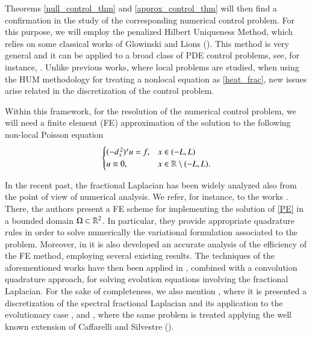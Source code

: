 Theorems \ref{null_control_thm} and \eqref{approx_control_thm} will then find a confirmation in the study of the corresponding numerical control problem. For this purpose, we will employ the penalized Hilbert Uniqueness Method, which relies on some classical works of Glowinski and Lions (\cite{glowinski1995exact,glowinski2008exact}). This method is very general and it can be applied to a broad class of PDE control problems, see, for instance, \cite{boyer2013penalised,boyer2017insensitizing,boyer2014approximate,khodja2017partial}. Unlike previous works, where local problems are studied, when using the HUM methodology for treating a nonlocal equation as \eqref{heat_frac}, new issues arise related in the discretization of the control problem. 

Within this framework, for the resolution of the numerical control problem, we will need a finite element (FE)  approximation of the solution to the following non-local Poisson equation
\begin{align}\label{PE}
	\begin{cases}
		(-d_x^{\,2})^{s}u = f, & x\in(-L,L)
		\\
		u\equiv 0, & x\in\mathbb{R}\setminus(-L,L).
	\end{cases}
\end{align}

In the recent past, the fractional Laplacian has been widely analyzed also from the point of view of numerical analysis. We refer, for instance, to the works \cite{acosta2017short,acosta2017fractional,borthagaray2017laplaciano}. There, the authors present a FE scheme for implementing the solution of \eqref{PE} in a bounded domain $\Omega\subset\mathbb{R}^2$. In particular, they provide appropriate quadrature rules in order to solve numerically the variational formulation associated to the problem. Moreover, in \cite{acosta2017fractional,borthagaray2017laplaciano} it is also developed an accurate analysis of the efficiency of the FE method, employing several existing results. The techniques of the aforementioned works have then been applied in \cite{acosta2017finite}, combined with a convolution quadrature approach, for solving evolution equations involving the fractional Laplacian. For the sake of completeness, we also mention \cite{bonito2015numerical}, where it is presented a discretization of the spectral fractional Laplacian and its application to the evolutionary case \cite{bonito2017approximation}, and \cite{nochetto2015pde}, where the same problem is treated applying the well known extension of Caffarelli and Silvestre (\cite{caffarelli2007extension}).   

